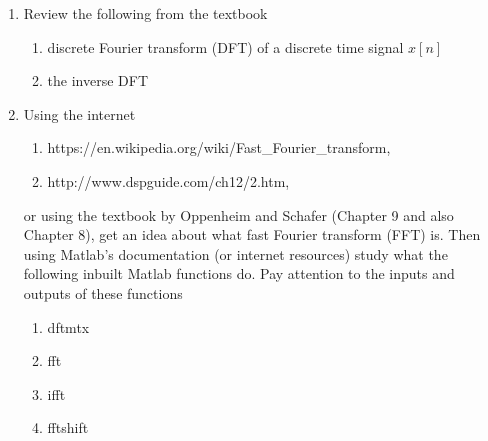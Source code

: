 \begin{enumerate}
  \item Review the following from the textbook
  \begin{enumerate}
  \item discrete Fourier transform (DFT) of a discrete time signal $x[n]$
  \item the inverse DFT 
  \end{enumerate}
\item Using the internet
  \begin{enumerate}
  \item https://en.wikipedia.org/wiki/Fast\_Fourier\_transform, 
  \item http://www.dspguide.com/ch12/2.htm,
  \end{enumerate}
  or using the textbook by Oppenheim and Schafer (Chapter 9 and also Chapter 8), get an idea about what fast Fourier transform (FFT) is. Then using Matlab's documentation (or internet resources) study what the following inbuilt Matlab functions do. Pay attention to the inputs and outputs of these functions
  \begin{enumerate}
  \item dftmtx
  \item fft
  \item ifft
  \item fftshift
  \end{enumerate}


\end{enumerate}
